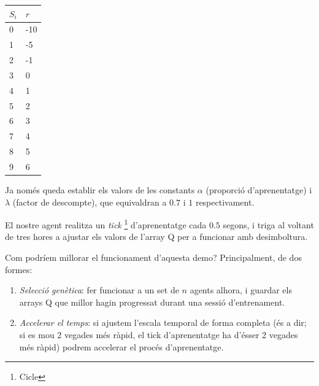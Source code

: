 \begin{center} \label{tb:rewards}
    \begin{tabular}{| l | l |}
    \hline
    \(S_i\) & \(r\) \\ \hline
    0 & -10 \\ \hline
    1 & -5 \\ \hline
    2 & -1 \\ \hline
    3 & 0 \\ \hline
    4 & 1 \\ \hline
    5 & 2 \\ \hline
    6 & 3 \\ \hline
    7 & 4 \\ \hline
    8 & 5 \\ \hline
    9 & 6 \\ \hline
    \end{tabular}
\end{center}

Ja només queda establir els valors de les constants \(\alpha\) (proporció d'aprenentatge) i \(\lambda\) (factor de descompte), que equivaldran
a \(0.7\) i \(1\) respectivament.

El nostre agent realitza un \emph{tick} \footnote{Cicle} d'aprenentatge cada \(0.5\) segons, i triga al voltant de tres hores a ajustar els
valors de l'array Q per a funcionar amb desimboltura.

Com podríem millorar el funcionament d'aquesta demo? Principalment, de dos formes:

\begin{enumerate}
\item \emph{Selecció genètica}: fer funcionar a un set de \(n\) agents alhora, i guardar els arrays Q que millor hagin progressat durant
una sessió d'entrenament.
\item \emph{Accelerar el temps}: si ajustem l'escala temporal de forma completa (és a dir; si es mou 2 vegades més ràpid, el tick d'aprenentatge
ha d'ésser 2 vegades més ràpid) podrem accelerar el procés d'aprenentatge.
\end{enumerate}













